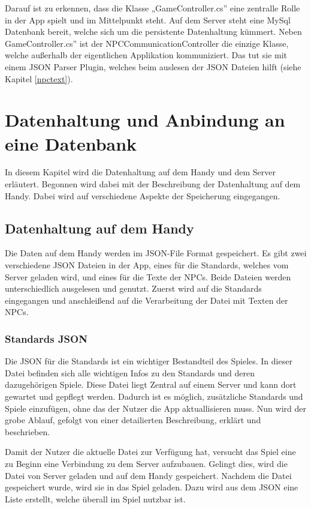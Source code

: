 	Darauf ist zu erkennen, dass die Klasse „GameController.cs” eine zentralle Rolle in der App spielt und im Mittelpunkt steht. Auf dem Server steht eine MySql Datenbank bereit, welche sich um die persistente Datenhaltung kümmert. Neben GameController.cs” ist der NPCCommunicationController die einzige Klasse, welche außerhalb der eigentlichen Applikation kommuniziert. Das tut sie mit einem \ac{JSON} Parser Plugin, welches beim auslesen der \ac{JSON} Dateien hilft (siehe Kapitel \ref{npctext}).	

\section{Datenhaltung und Anbindung an eine Datenbank}
	In diesem Kapitel wird die Datenhaltung auf dem Handy und dem Server erläutert. Begonnen wird dabei mit der Beschreibung der Datenhaltung auf dem Handy. Dabei wird auf verschiedene Aspekte der Speicherung eingegangen.

\subsection{Datenhaltung auf dem Handy}
	Die Daten auf dem Handy werden im \ac{JSON}-File Format gespeichert. Es gibt zwei verschiedene \ac{JSON} Dateien in der App, eines für die Standards, welches vom Server geladen wird, und eines für die Texte der \acp{NPC}. Beide Dateien werden unterschiedlich ausgelesen und genutzt. Zuerst wird auf die Standards eingegangen und anschleißend auf die Verarbeitung der Datei mit Texten der \acp{NPC}. 
	
\subsubsection{Standards \ac{JSON}}
	Die \ac{JSON} für die Standards ist ein wichtiger Bestandteil des Spieles. In dieser Datei befinden sich alle wichtigen Infos zu den Standards und deren dazugehörigen Spiele. Diese Datei liegt Zentral auf einem Server und kann dort gewartet und gepflegt werden. Dadurch ist es möglich, zusätzliche Standards und Spiele einzufügen, ohne das der Nutzer die App aktuallisieren muss. Nun wird der grobe Ablauf, gefolgt von einer detailierten Beschreibung, erklärt und beschrieben.
	
	Damit der Nutzer die aktuelle Datei zur Verfügung hat, versucht das Spiel eine zu Beginn eine Verbindung zu dem Server aufzubauen. Gelingt dies, wird die Datei von Server geladen und auf dem Handy gespeichert. Nachdem die Datei gespeichert wurde, wird sie in das Spiel geladen. Dazu wird aus dem \ac{JSON} eine Liste erstellt, welche überall im Spiel nutzbar ist.
	

